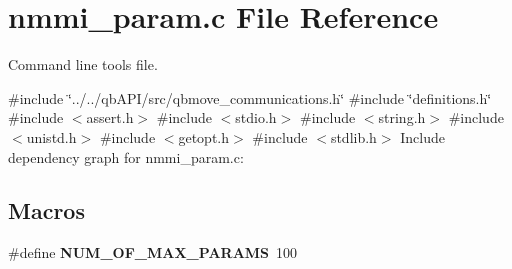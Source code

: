 \section{nmmi\+\_\+param.\+c File Reference}
\label{nmmi__param_8c}


Command line tools file.  


{\ttfamily \#include \char`\"{}../../qb\+A\+P\+I/src/qbmove\+\_\+communications.\+h\char`\"{}}\newline
{\ttfamily \#include \char`\"{}definitions.\+h\char`\"{}}\newline
{\ttfamily \#include $<$assert.\+h$>$}\newline
{\ttfamily \#include $<$stdio.\+h$>$}\newline
{\ttfamily \#include $<$string.\+h$>$}\newline
{\ttfamily \#include $<$unistd.\+h$>$}\newline
{\ttfamily \#include $<$getopt.\+h$>$}\newline
{\ttfamily \#include $<$stdlib.\+h$>$}\newline
Include dependency graph for nmmi\+\_\+param.\+c\+:
\subsection*{Macros}
\begin{DoxyCompactItemize}
\item 
\mbox{\label{nmmi__param_8c_a1631ab57d507b38c3bd2bde962254ac4}} 
\#define {\bfseries N\+U\+M\+\_\+\+O\+F\+\_\+\+M\+A\+X\+\_\+\+P\+A\+R\+A\+MS}~100
\end{DoxyCompactItemize}
